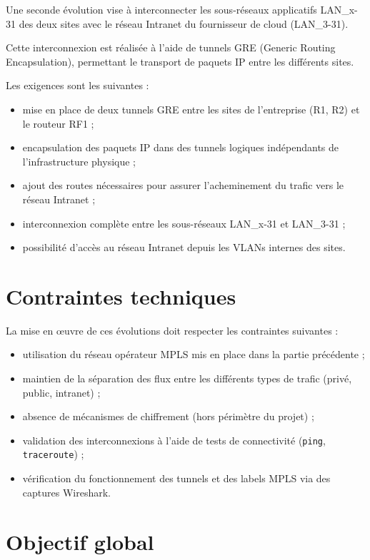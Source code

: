 \documentclass[11pt,a4paper]{memoir}%
\begin{document}
	Une seconde évolution vise à interconnecter les sous-réseaux applicatifs LAN\_x-31 des deux sites avec le réseau Intranet du fournisseur de cloud (LAN\_3-31).
	
	Cette interconnexion est réalisée à l’aide de tunnels GRE (Generic Routing Encapsulation), permettant le transport de paquets IP entre les différents sites.
	
	Les exigences sont les suivantes :
	\begin{itemize}
		\item mise en place de deux tunnels GRE entre les sites de l’entreprise (R1, R2) et le routeur RF1 ;
		\item encapsulation des paquets IP dans des tunnels logiques indépendants de l’infrastructure physique ;
		\item ajout des routes nécessaires pour assurer l’acheminement du trafic vers le réseau Intranet ;
		\item interconnexion complète entre les sous-réseaux LAN\_x-31 et LAN\_3-31 ;
		\item possibilité d’accès au réseau Intranet depuis les VLANs internes des sites.
	\end{itemize}
	
	\section{Contraintes techniques}
	
	La mise en œuvre de ces évolutions doit respecter les contraintes suivantes :
	\begin{itemize}
		\item utilisation du réseau opérateur MPLS mis en place dans la partie précédente ;
		\item maintien de la séparation des flux entre les différents types de trafic (privé, public, intranet) ;
		\item absence de mécanismes de chiffrement (hors périmètre du projet) ;
		\item validation des interconnexions à l’aide de tests de connectivité (\texttt{ping}, \texttt{traceroute}) ;
		\item vérification du fonctionnement des tunnels et des labels MPLS via des captures Wireshark.
	\end{itemize}
	
	\section{Objectif global}
	
\end{document}

